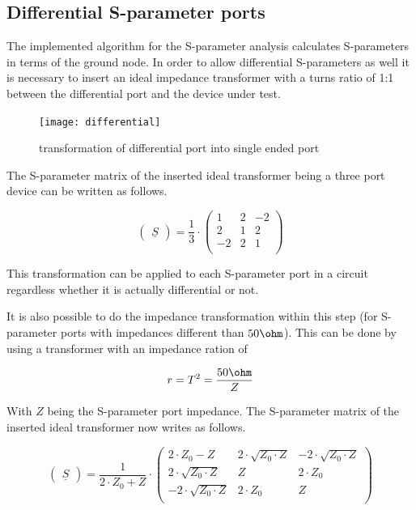 \documentclass[10pt]{report}
\begin{document}
\subsection{Differential S-parameter ports}

The implemented algorithm for the S-parameter analysis calculates
S-parameters in terms of the ground node.  In order to allow
differential S-parameters as well it is necessary to insert an ideal
impedance transformer with a turns ratio of 1:1 between the
differential port and the device under test.

\begin{figure}[ht]
\begin{center}
\texttt{[image: differential]}
\end{center}
\caption{transformation of differential port into single ended port}
\label{fig:differential}
\end{figure}
\FloatBarrier

The S-parameter matrix of the inserted ideal transformer being a three
port device can be written as follows.

\begin{equation}
\begin{pmatrix}
\underline{S}
\end{pmatrix}
= \dfrac{1}{3}\cdot
\begin{pmatrix}
1 & 2 & -2\\
2 & 1 & 2\\
-2 & 2 & 1\\
\end{pmatrix}
\end{equation}

This transformation can be applied to each S-parameter port in a
circuit regardless whether it is actually differential or not.

\addvspace{12pt}

It is also possible to do the impedance transformation within this step
(for S-parameter ports with impedances different than $50\ohm$). This can
be done by using a transformer with an impedance ration of

\begin{equation}
r=T^2=\frac{50\ohm}{Z}
\end{equation}

With $Z$ being the S-parameter port impedance. The S-parameter matrix of
the inserted ideal transformer now writes as follows.

\begin{equation}
\begin{pmatrix}
\underline{S}
\end{pmatrix}
= \dfrac{1}{2\cdot Z_0+Z}\cdot
\begin{pmatrix}
2\cdot Z_0-Z              & 2\cdot\sqrt{Z_0\cdot Z}  & -2\cdot\sqrt{Z_0\cdot Z}\\
2\cdot\sqrt{Z_0\cdot Z}   & Z                        & 2\cdot Z_0\\
-2\cdot\sqrt{Z_0\cdot Z}  & 2\cdot Z_0               & Z\\
\end{pmatrix}
\end{equation}
\end{document}
